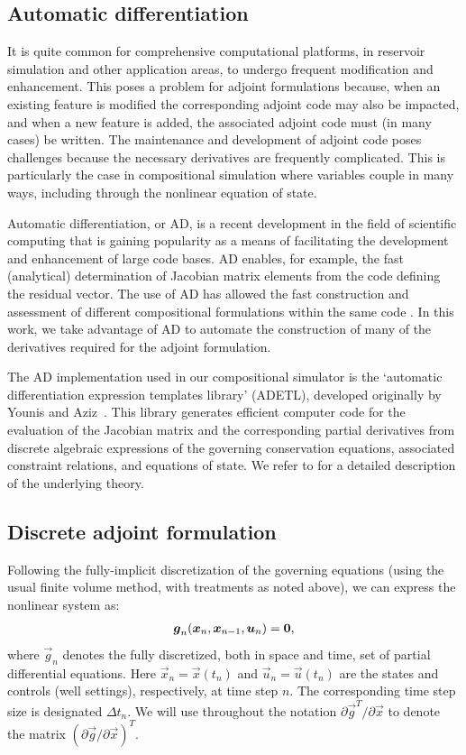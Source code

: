\documentclass[twocolumn,numbook]{svjour3}          %
\def\u{{\vec u}}
\def\x{{\vec x}}
\def\p{{\vec{g}}}
\def\0{{\vec 0}}
\begin{document}
\subsection{Automatic differentiation} \label{sec:autodiff}


It is quite common for comprehensive computational platforms, in reservoir
simulation and other application areas, to undergo frequent modification and enhancement. This poses a problem for adjoint formulations
because, when an existing feature is modified the corresponding adjoint code may
also be impacted, and when a new feature is added, the associated adjoint code
must (in many cases) be written. The maintenance and development of adjoint code
poses challenges because the necessary derivatives are frequently complicated.
This is particularly the case in compositional simulation where variables couple
in many ways, including through the nonlinear equation of state.


Automatic differentiation, or AD, is a recent development in the field of
scientific computing that is gaining popularity as a means of facilitating the
development and enhancement of large code bases. AD enables, for example, the
fast (analytical) determination of Jacobian matrix elements from the code
defining the residual vector. The use of AD has allowed the fast construction
and assessment of different compositional formulations within the same code
\cite{Voskov_nonlinear:2009}. In this work, we take advantage of AD to automate
the construction of many of the derivatives required for the adjoint
formulation.


The AD implementation used in our compositional simulator is the `automatic
differentiation expression templates library' (ADETL), developed originally by
Younis and Aziz~\cite{Younis:2007}.  This library generates efficient computer
code for the evaluation of the Jacobian matrix and the corresponding partial
derivatives from discrete algebraic expressions of the governing conservation
equations, associated constraint relations, and equations of state. We refer to
\cite{Younis:2007} for a detailed description of the underlying theory.


\subsection{Discrete adjoint formulation} \label{section:discreteAdjoint}

Following the fully-implicit discretization of the governing equations (using the usual finite volume method, with treatments as noted above), we can express the nonlinear system as:
%
\begin{align}
\label{eq:DiscretizedEquations}
\p_n(\x_n, \x_{n-1}, \u_n) =  \0 \rm,
\end{align}
%
where $\p_n$ denotes the fully discretized, both in space and time,
set of partial differential equations. Here $\x_n = \x(t_n)$ and $\u_n =
\u(t_n)$ are the states and controls (well settings), respectively, at time step $n$. The corresponding time step size
is designated $\Delta t_n$. We will use throughout the notation $\partial \p^T / \partial \x$ to denote the matrix $(\partial \p / \partial \x)^T$.
\end{document}
